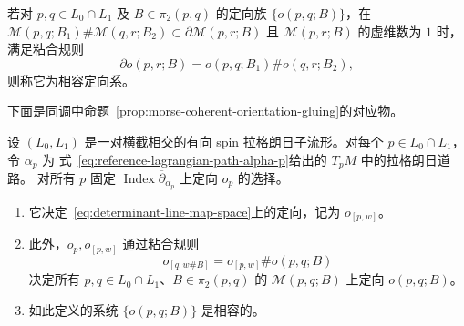 \begin{definition}[相容定向系]
\label{def:coherent-system-floer-orientations}
若对 $p,q\in L_0\cap L_1$ 及 $B\in\pi_2(p,q)$ 的定向族
$\{o(p,q;B)\}$，在
$\mathcal M(p,q;B_1)\#\mathcal M(q,r;B_2)
\subset\partial\overline{\mathcal M}(p,r;B)$ 且
$\mathcal M(p,r;B)$ 的虚维数为 $1$ 时，满足粘合规则
\begin{equation}
 \partial o(p,r;B)=o(p,q;B_1)\#o(q,r;B_2),
 \label{eq:coherent-floer-orientation-gluing-rule}
\end{equation}
则称它为相容定向系。
\end{definition}

下面是\personFloer{}同调中命题~\ref{prop:morse-coherent-orientation-gluing}的对应物。

\begin{theorem}
\label{thm:construction-coherent-floer-orientations}
设 $(L_0,L_1)$ 是一对横截相交的有向 spin 拉格朗日子流形。对每个
$p\in L_0\cap L_1$，令 $\alpha_p$ 为
式~\eqref{eq:reference-lagrangian-path-alpha-p}给出的 $T_pM$ 中的拉格朗日道路。
对所有 $p$ 固定 $\operatorname{Index}\overline\partial_{\alpha_p}$ 上定向 $o_p$ 的选择。
\begin{enumerate}[label=(\arabic*)]
\item 它决定~\eqref{eq:determinant-line-map-space}上的定向，记为 $o_{[p,w]}$。
\item 此外，$o_p,o_{[p,w]}$ 通过粘合规则
\begin{equation}
 o_{[q,w\#B]}=o_{[p,w]}\#o(p,q;B)
 \label{eq:orientation-capping-gluing-rule}
\end{equation}
决定所有 $p,q\in L_0\cap L_1$、$B\in\pi_2(p,q)$ 的
$\mathcal M(p,q;B)$ 上定向 $o(p,q;B)$。
\item 如此定义的系统 $\{o(p,q;B)\}$ 是相容的。
\end{enumerate}
\end{theorem}

